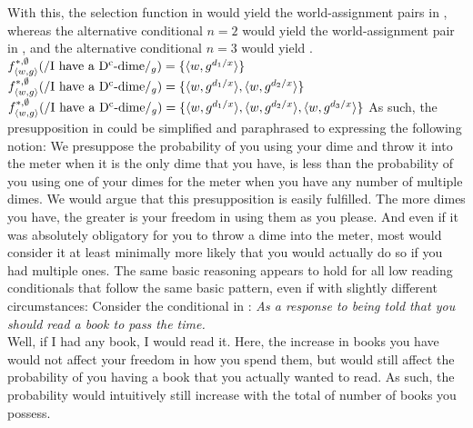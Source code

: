 \noindent With this, the selection function in  would yield the world-assignment pairs in , whereas the alternative conditional $n=2$ would yield the world-assignment pair in , and the alternative conditional $n=3$ would yield .
\pex
\a $f^{*,\emptyset}_{\langle w,g\rangle}(/\text{I have a D\textsuperscript{c}-dime}/_g)=\{\langle w,g^{d_1/x}\rangle\}$
\a $f^{*,\emptyset}_{\langle w,g\rangle}(/\text{I have a D\textsuperscript{c}-dime}/_g)=\{\langle w,g^{d_1/x}\rangle,\langle w,g^{d_2/x}\rangle\}$
\a $f^{*,\emptyset}_{\langle w,g\rangle}(/\text{I have a D\textsuperscript{c}-dime}/_g)=\{\langle w,g^{d_1/x}\rangle,\langle w,g^{d_2/x}\rangle,\langle w,g^{d_3/x}\rangle\}$
\xe
As such, the presupposition in  could be simplified and paraphrased to expressing the following notion: We presuppose the probability of you using your dime and throw it into the meter when it is the only dime that you have, is less than the probability of you using one of your dimes for the meter when you have any number of multiple dimes. We would argue that this presupposition is easily fulfilled. The more dimes you have, the greater is your freedom in using them as you please. And even if it was absolutely obligatory for you to throw a dime into the meter, most would consider it at least minimally more likely that you would actually do so if you had multiple ones. The same basic reasoning appears to hold for all low reading conditionals that follow the same basic pattern, even if with slightly different circumstances: Consider the conditional in :
\ex\textit{As a response to being told that you should read a book to pass the time.}\\
Well, if I had any book, I would read it.
\xe
Here, the increase in books you have would not affect your freedom in how you spend them, but would still affect the probability of you having a book that you actually wanted to read. As such, the probability would intuitively still increase with the total of number of books you possess.

